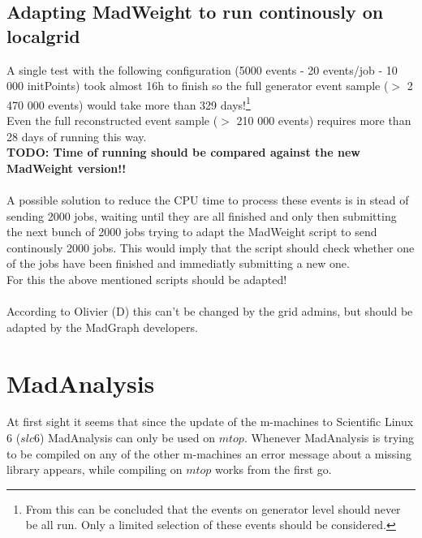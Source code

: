 \subsection{Adapting MadWeight to run continously on localgrid}
A single test with the following configuration (5000 events - 20 events/job - 10 000 initPoints) took almost 16h to finish so the full generator event sample ($>$ 2 470 000 events) would take more than 329 days!\footnote{From this can be concluded that the events on generator level should never be all run. Only a limited selection of these events should be considered.}\\
Even the full reconstructed event sample ($>$ 210 000 events) requires more than 28 days of running this way.\\
\textbf{TODO: Time of running should be compared against the new MadWeight version!!}\\
\\
A possible solution to reduce the CPU time to process these events is in stead of sending 2000 jobs, waiting until they are all finished and only then submitting the next bunch of 2000 jobs trying to adapt the MadWeight script to send continously 2000 jobs. This would imply that the script should check whether one of the jobs have been finished and immediatly submitting a new one.\\
For this the above mentioned scripts should be adapted!\\
\\
According to Olivier (D) this can't be changed by the grid admins, but should be adapted by the MadGraph developers. 

\section{MadAnalysis}
At first sight it seems that since the update of the m-machines to Scientific Linux 6 ($slc6$) MadAnalysis can only be used on $mtop$. Whenever MadAnalysis is trying to be compiled on any of the other m-machines an error message about a missing library appears, while compiling on $mtop$ works from the first go.

